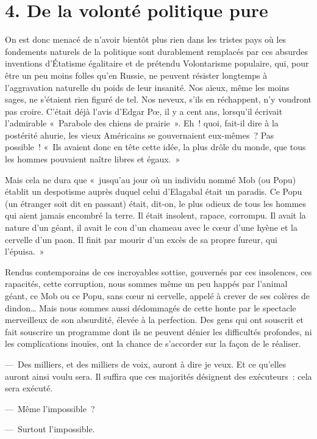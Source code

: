 \documentclass[french,twoside]{book} %
\begin{document}
\section[4. De la volonté politique pure]{4. De la volonté politique pure}
\noindent On est donc menacé de n’avoir bientôt plus rien dans les tristes pays où les fondements naturels de la politique sont durablement remplacés par ces absurdes inventions d’Étatisme égalitaire et de prétendu Volontarisme populaire, qui, pour être un peu moins folles qu’en Russie, ne peuvent résister longtemps à l’aggravation naturelle du poids de leur insanité. Nos aïeux, même les moins sages, ne s’étaient rien figuré de tel. Nos neveux, s’ils en réchappent, n’y voudront pas croire. C’était déjà l’avis d’Edgar Pœ, il y a cent ans, lorsqu’il écrivait l’admirable « Parabole des chiens de prairie ». Eh ! quoi, fait-il dire à la postérité ahurie, les vieux Américains se gouvernaient eux-mêmes ? Pas possible ! « Ils avaient donc en tête cette idée, la plus drôle du monde, que tous les hommes pouvaient naître libres et égaux. »\par
Mais cela ne dura que « jusqu’au jour où un individu nommé Mob (ou Popu) établit un despotisme auprès duquel celui d’Elagabal était un paradis. Ce Popu (un étranger soit dit en passant) était, dit-on, le plus odieux de tous les hommes qui aient jamais encombré la terre. Il était insolent, rapace, corrompu. Il avait la nature d’un géant, il avait le cou d’un chameau avec le cœur d’une hyène et la cervelle d’un paon. Il finit par mourir d’un excès de sa propre fureur, qui l’épuisa. »\par
Rendus contemporains de ces incroyables sottise, gouvernés par ces insolences, ces rapacités, cette corruption, nous sommes même un peu happés par l’animal géant, ce Mob ou ce Popu, sans cœur ni cervelle, appelé à crever de ses colères de dindon… Mais nous sommes aussi dédommagés de cette honte par le spectacle merveilleux de son absurdité, élevée à la perfection. Des gens qui ont souscrit et fait souscrire un programme dont ils ne peuvent dénier les difficultés profondes, ni les complications inouïes, ont la chance de s’accorder sur la façon de le réaliser.\par
— Des milliers, et des milliers de voix, auront à dire je veux. Et ce qu’elles auront ainsi voulu sera. Il suffira que ces majorités désignent des exécuteurs : cela sera exécuté.\par
— Même l’impossible ?\par
— Surtout l’impossible.\par
\end{document}
